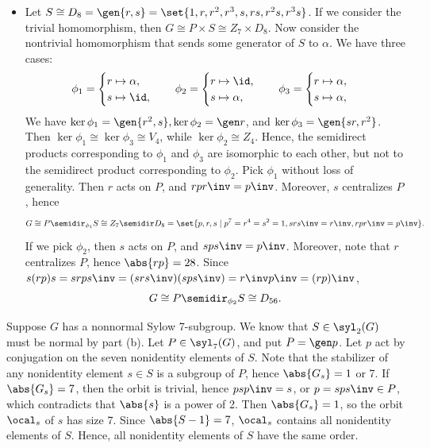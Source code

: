 \begin{solenum}
\begin{itemize}
\[        \]
        Note that nontriviality of the homomorphism implies that some $s \in S$ does not centralize $P$.
        If $G$ could be written as a direct product, then $S$ would centralize $P$, which is a contradiction.
        Hence, $G$ is not a direct product.
        \item Let $S \cong D_8 = \gen{r, s} = \set{1, r, r^2, r^3, s, rs, r^2s, r^3s}$.
        If we consider the trivial homomorphism, then $G \cong P \times S \cong Z_7 \times D_8$.
        Now consider the nontrivial homomorphism that sends some generator of $S$ to $\alpha$.
        We have three cases:
        \[
        	\phi_1 = 
            \begin{cases}
                r \mapsto \alpha, \\
                s \mapsto \id,
            \end{cases} \quad
            \phi_2 =
            \begin{cases}
                r \mapsto \id, \\
                s \mapsto \alpha,
            \end{cases} \quad
            \phi_3 =
            \begin{cases}
                r \mapsto \alpha, \\
                s \mapsto \alpha,
            \end{cases}
        \]
        We have $\ker\phi_1 = \gen{r^2, s}, \ker\phi_2 = \gen r$, and $\ker\phi_3 = \gen{sr, r^2}$.
        Then $\ker\phi_1 \cong \ker\phi_3 \cong V_4$, while $\ker\phi_2 \cong Z_4$.
        Hence, the semidirect products corresponding to $\phi_1$ and $\phi_3$ are isomorphic to each other, but not to the semidirect product corresponding to $\phi_2$.
        Pick $\phi_1$ without loss of generality.
        Then $r$ acts on $P$, and $rpr\inv = p\inv$.
        Moreover, $s$ centralizes $P$, hence
        \[
        	G \cong P \semidir_{\phi_1} S \cong Z_7 \semidir D_8 = \set{p, r, s \mid p^7 = r^4 = s^2 = 1, srs\inv = r\inv, rpr\inv = p\inv}.
        \]
        If we pick $\phi_2$, then $s$ acts on $P$, and $sps\inv = p\inv$.
        Moreover, note that $r$ centralizes $P$, hence $\abs{rp} = 28$.
        Since $s(rp)s = srps\inv = (srs\inv)(sps\inv) = r\inv p\inv = (rp)\inv$,
        \[
        	G \cong P \semidir_{\phi_2} S \cong D_{56}.
        \]
    \end{itemize}
    \item Suppose $G$ has a nonnormal Sylow 7-subgroup.
	We know that $S \in \syl_2(G)$ must be normal by part (b).
	Let $P \in \syl_7(G)$, and put $P = \gen p$.
	Let $p$ act by conjugation on the seven nonidentity elements of $S$.
	Note that the stabilizer of any nonidentity element $s \in S$ is a subgroup of $P$, hence $\abs{G_s} = 1$ or 7.
	If $\abs{G_s} = 7$, then the orbit is trivial, hence $psp\inv = s$, or $p = sps\inv \in P$, which contradicts that $\abs{s}$ is a power of 2.
	Then $\abs{G_s} = 1$, so the orbit $\ocal_s$ of $s$ has size 7.
	Since $\abs{S - 1} = 7$, $\ocal_s$ contains all nonidentity elements of $S$.
	Hence, all nonidentity elements of $S$ have the same order.
    

\end{solenum}
